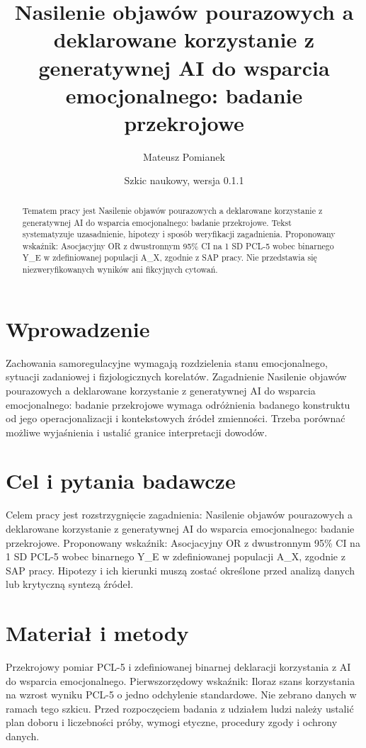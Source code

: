 \documentclass[11pt,a4paper]{article}
\title{Nasilenie objawów pourazowych a deklarowane korzystanie z generatywnej AI do wsparcia emocjonalnego: badanie przekrojowe}
\author{Mateusz Pomianek}
\date{Szkic naukowy, wersja 0.1.1}
\begin{document}
\maketitle

\begin{abstract}

Tematem pracy jest Nasilenie objawów pourazowych a deklarowane korzystanie z generatywnej AI do wsparcia emocjonalnego: badanie przekrojowe. Tekst systematyzuje uzasadnienie, hipotezy i sposób weryfikacji zagadnienia. Proponowany wskaźnik: Asocjacyjny OR z dwustronnym 95\% CI na 1 SD PCL-5 wobec binarnego Y\_E w zdefiniowanej populacji A\_X, zgodnie z SAP pracy. Nie przedstawia się niezweryfikowanych wyników ani fikcyjnych cytowań.

\end{abstract}

\section{Wprowadzenie}

Zachowania samoregulacyjne wymagają rozdzielenia stanu emocjonalnego, sytuacji zadaniowej i fizjologicznych korelatów. Zagadnienie Nasilenie objawów pourazowych a deklarowane korzystanie z generatywnej AI do wsparcia emocjonalnego: badanie przekrojowe wymaga odróżnienia badanego konstruktu od jego operacjonalizacji i kontekstowych źródeł zmienności. Trzeba porównać możliwe wyjaśnienia i ustalić granice interpretacji dowodów.

\section{Cel i pytania badawcze}

Celem pracy jest rozstrzygnięcie zagadnienia: Nasilenie objawów pourazowych a deklarowane korzystanie z generatywnej AI do wsparcia emocjonalnego: badanie przekrojowe. Proponowany wskaźnik: Asocjacyjny OR z dwustronnym 95\% CI na 1 SD PCL-5 wobec binarnego Y\_E w zdefiniowanej populacji A\_X, zgodnie z SAP pracy. Hipotezy i ich kierunki muszą zostać określone przed analizą danych lub krytyczną syntezą źródeł.

\section{Materiał i metody}

Przekrojowy pomiar PCL-5 i zdefiniowanej binarnej deklaracji korzystania z AI do wsparcia emocjonalnego. Pierwszorzędowy wskaźnik: Iloraz szans korzystania na wzrost wyniku PCL-5 o jedno odchylenie standardowe. Nie zebrano danych w ramach tego szkicu. Przed rozpoczęciem badania z udziałem ludzi należy ustalić plan doboru i liczebności próby, wymogi etyczne, procedury zgody i ochrony danych.
\end{document}
